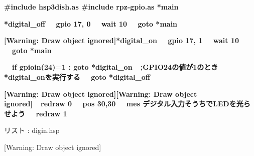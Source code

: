\documentclass[a4paper,dvipdfmx]{jarticle}
\newcounter{List}
\renewcommand\theList{\arabic{List}}
\begin{document}
\centering
\begin{minipage}{17.006cm}
{\ttfamily\bfseries
\#include {\textquotedbl}hsp3dish.as{\textquotedbl}\newline
\#include {\textquotedbl}rpz-gpio.as{\textquotedbl}\newline
\newline
*main\newline
 }

\begin{minipage}{16.48cm}
{\ttfamily\bfseries
*digital\_off\newline
\ \ gpio 17, 0\newline
\ \ wait 10\newline
\ \ goto *main }
\end{minipage}\begin{minipage}{16.501cm}
{\ttfamily\bfseries
[Warning: Draw object ignored]*digital\_on\newline
\ \ gpio 17, 1\newline
\ \ wait 10\newline
\ \ goto *main}
\end{minipage}\begin{minipage}{16.538cm}
{\ttfamily\bfseries
\ \ if gpioin(24)=1 : goto
*digital\_on\ \ \textcolor[rgb]{0.0,0.0,0.6}{;GPIO24の値が1のとき*digital\_onを実行する}\newline
\ \ goto *digital\_off}
\end{minipage}\begin{minipage}{16.485cm}
{\ttfamily\bfseries
[Warning: Draw object ignored][Warning: Draw object ignored]\ \ redraw 0\newline
\ \ pos 30,30\newline
\ \ mes
{\textquotedbl}デジタル入力そうちでLEDを光らせよう{\textquotedbl}\newline
\ \ redraw 1}
\end{minipage}{\mdseries
リスト \stepcounter{List}{\theList}: digin.hsp}
\end{minipage}

\bigskip


\bigskip

[Warning: Draw object ignored]


\bigskip


\bigskip


\bigskip


\bigskip


\bigskip
\end{document}
